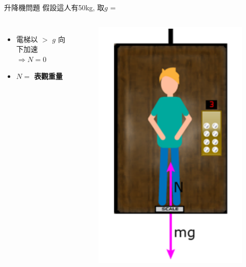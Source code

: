 \documentclass[beamer=true]{standalone}
\begin{document}
\begin{frame}{升降機問題}
    假設這人有50kg, 取$g$ = 

    \begin{columns}
        \begin{itemize}
            \setlength{\itemsep}{15pt}

            \item 電梯以 $>$ $g$\acc{} 向下加速 \\$\Rightarrow N=0$
            \item $N=$ \textbf{表觀重量}
        \end{itemize}
        \begin{figure}[h!]
            \centering
            \includegraphics[width=\textwidth]{assets/6596ff5b.png}
        \end{figure}
    \end{columns}
\end{frame}
\end{document}
